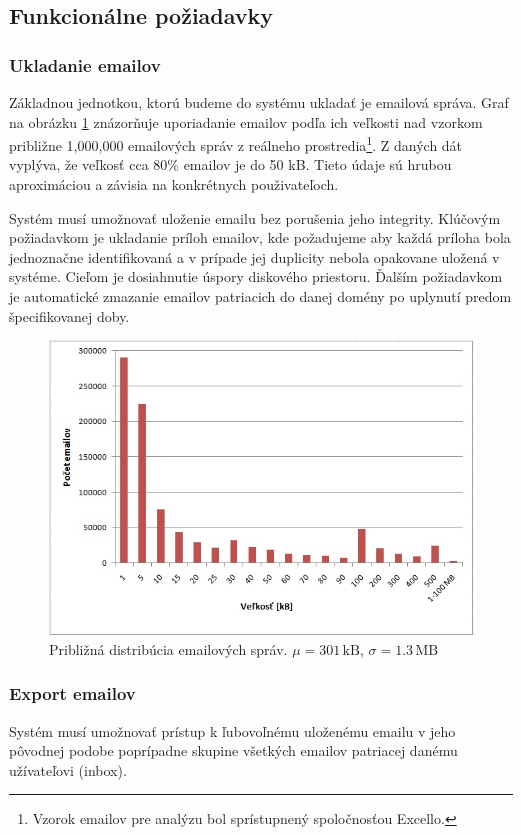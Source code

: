 \documentclass[11pt,twoside,a4paper]{book}
\begin{document}
\subsection{Funkcionálne požiadavky}

\subsubsection*{Ukladanie emailov}
Základnou jednotkou, ktorú budeme do systému ukladať je emailová správa. Graf na obrázku \ref{fig:emailHist} znázorňuje uporiadanie emailov podľa ich veľkosti nad vzorkom približne 1,000,000 emailových správ z reálneho prostredia\footnote{Vzorok emailov pre analýzu bol sprístupnený spoločnosťou Excello.}. Z daných dát vyplýva, že veľkosť cca 80\% emailov je do 50 kB. Tieto údaje sú hrubou aproximáciou a závisia na konkrétnych použivateľoch.

Systém musí umožnovať uloženie emailu bez porušenia jeho integrity. Klúčovým požiadavkom je ukladanie príloh emailov, kde požadujeme aby každá príloha bola jednoznačne identifikovaná a v prípade jej duplicity nebola opakovane uložená v systéme. Cieľom je dosiahnutie úspory diskového priestoru. Ďalším požiadavkom je automatické zmazanie emailov patriacich do danej domény po uplynutí predom špecifikovanej doby.

\begin{figure}[h]
 \centering
 \includegraphics[width=12cm]{./figures/emailsHist.png}
 \caption{Približná distribúcia emailových správ. $\mu = 301\,\mathrm{kB}$, $\sigma = 1.3\,\mathrm{MB}$}
 \label{fig:emailHist}
\end{figure}


\subsubsection*{Export emailov}
Systém musí umožnovať prístup k ľubovoľnému uloženému emailu v jeho pôvodnej podobe poprípadne skupine všetkých emailov patriacej danému užívateľovi (inbox).
\end{document}
